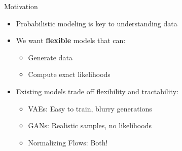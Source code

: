 \begin{frame}[allowframebreaks]{}
    \begin{figure}
        \centering
    \end{figure}
\end{frame}

\begin{frame}{Motivation}
    \begin{itemize}
        \item Probabilistic modeling is key to understanding data
        \item We want \textbf{flexible} models that can:
        \begin{itemize}
            \item Generate data
            \item Compute exact likelihoods
        \end{itemize}
        \item Existing models trade off flexibility and tractability:
        \begin{itemize}
            \item VAEs: Easy to train, blurry generations
            \item GANs: Realistic samples, no likelihoods
            \item Normalizing Flows: Both!
        \end{itemize}
    \end{itemize}
\end{frame}